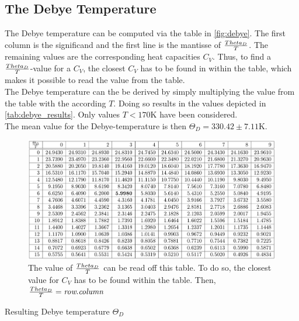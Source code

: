 \subsection{The Debye Temperature}
The Debye temperature can be computed via the table in \autoref{fig:debye}. The first column is the significand and the first line is the mantisse of $\frac{\\Theta_D}{T}$. The remaining values are the corresponding heat capacities $C_V$. Thus, to find a $\frac{\\Theta_D}{T}$-value for a $C_V$, the closest $C_V$ has to be found in within the table, which makes it possible to read the value from the table.\\
The Debye temperature can the be derived by simply multiplying the value from the table with the according $T$. Doing so results in the values depicted in \autoref{tab:debye_results}. Only values $T<170\text{K}$ have been considered.\\
The mean value for the Debye-temperature is then $\Theta_D = 330.42 \pm 7.11 \text{K}$.
\begin{figure}[h!]
  \centering
  \includegraphics[width=\textwidth]{figures/Debye_values.png}
  \caption{The value of $\frac{\\Theta_D}{T}$ can be read off this table. To do so, the closest value for $C_V$ has to be found within the table. Then, $\frac{\\Theta_D}{T} = \textit{row}.\textit{column}$}
  \label{fig:debye}
\end{figure}

\begin{table}
  \centering
  
  \caption{Resulting Debye temperature $\Theta_D$}
  \label{tab:debye_results}
\end{table}

